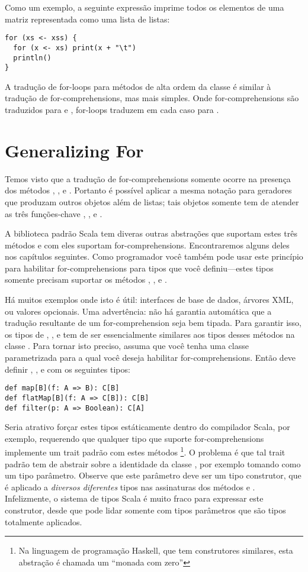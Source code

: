 Como um exemplo, a seguinte expressão imprime todos os elementos de uma matriz representada como 
uma lista de listas:
 \begin{lstlisting}
for (xs <- xss) {
  for (x <- xs) print(x + "\t")
  println()
}
\end{lstlisting}
A tradução de for-loops para métodos de alta ordem da classe  é similar à tradução de
for-comprehensions, mas mais simples. Onde for-comprehensions são traduzidos para  e 
, for-loops traduzem em cada caso para .

\section{Generalizing For}

Temos visto que a tradução de for-comprehensions somente ocorre na presença dos métodos ,
, e . Portanto é possível aplicar a mesma notação para geradores que 
produzam outros objetos além de listas; tais objetos somente tem de atender as três funções-chave ,
, e .

A biblioteca padrão Scala tem diveras outras abstrações que suportam estes três métodos e com eles suportam 
for-comprehensions. Encontraremos alguns deles nos capítulos seguintes. Como programador você também pode
usar este princípio para habilitar for-comprehensions para tipos que você definiu---estes tipos somente 
precisam suportar os métodos , , e .



Há muitos exemplos onde isto é útil: interfaces de base de dados, árvores XML, ou valores opcionais. 
Uma advertência: não há garantia automática que a tradução resultante de um for-comprehension seja 
bem tipada. Para garantir isso, os tipos de , , e  tem de ser
essencialmente similares aos tipos desses métodos na classe .
Para tornar isto preciso, assuma que você tenha uma classe parametrizada
  para a qual você deseja habilitar for-comprehensions. Então  deve definir 
, , e  com os seguintes tipos:
\begin{lstlisting}
def map[B](f: A => B): C[B]
def flatMap[B](f: A => C[B]): C[B]
def filter(p: A => Boolean): C[A]
\end{lstlisting}

Seria atrativo forçar estes tipos estáticamente dentro do compilador Scala, por exemplo, requerendo que 
qualquer tipo que suporte for-comprehensions implemente um trait padrão com estes métodos \footnote{Na 
linguagem de programação Haskell, que tem construtores similares, esta abstração é chamada 
um ``monada com zero''}. O problema é que tal trait padrão tem de abstrair sobre a identidade da classe , 
por exemplo tomando  como um tipo parâmetro. Observe que este parâmetro deve ser um tipo construtor, 
que é aplicado a {\em diversos diferentes} tipos nas assinaturas dos métodos  e .
Infelizmente, o sistema de tipos Scala é muito fraco para expressar este construtor, desde que pode lidar somente 
com tipos parâmetros que são tipos totalmente aplicados.

